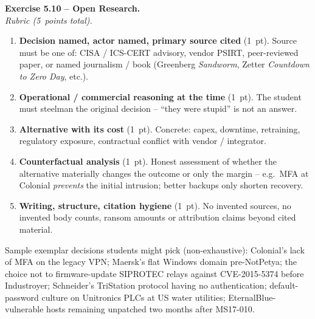 \documentclass[11pt,a4paper]{article}
\begin{document}
\begin{solutionbox}
\textbf{Exercise 5.10 -- Open Research.}\\
\emph{Rubric (5~points total).}
\begin{enumerate}\setlength{\itemsep}{0pt}
  \item \textbf{Decision named, actor named, primary source cited} (1~pt). Source must be one
        of: CISA / ICS-CERT advisory, vendor PSIRT, peer-reviewed paper, or named journalism /
        book (Greenberg \emph{Sandworm}, Zetter \emph{Countdown to Zero Day}, etc.).
  \item \textbf{Operational / commercial reasoning at the time} (1~pt). The student must
        steelman the original decision -- ``they were stupid'' is not an answer.
  \item \textbf{Alternative with its cost} (1~pt). Concrete: capex, downtime, retraining,
        regulatory exposure, contractual conflict with vendor / integrator.
  \item \textbf{Counterfactual analysis} (1~pt). Honest assessment of whether the alternative
        materially changes the outcome or only the margin -- e.g.\ MFA at Colonial \emph{prevents}
        the initial intrusion; better backups only shorten recovery.
  \item \textbf{Writing, structure, citation hygiene} (1~pt). No invented sources, no invented
        body counts, ransom amounts or attribution claims beyond cited material.
\end{enumerate}
Sample exemplar decisions students might pick (non-exhaustive): Colonial's lack of MFA on
the legacy VPN; Maersk's flat Windows domain pre-NotPetya; the choice not to firmware-update
SIPROTEC relays against CVE-2015-5374 before Industroyer; Schneider's TriStation protocol
having no authentication; default-password culture on Unitronics PLCs at US water utilities;
EternalBlue-vulnerable hosts remaining unpatched two months after MS17-010.
\end{solutionbox}
\end{document}
